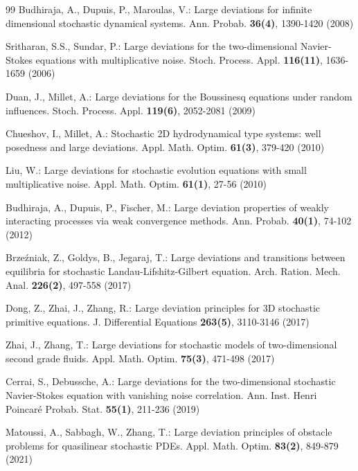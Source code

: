 \documentclass[11pt]{article}
\numberwithin{equation}{section}
\theoremstyle{plain}
\begin{document}
\begin{thebibliography}{99}
  Budhiraja, A.,  Dupuis, P.,  Maroulas, V.:
  Large deviations for infinite dimensional stochastic dynamical systems.
  Ann. Probab. {\bf 36(4)}, 1390-1420 (2008)




  Sritharan, S.S.,  Sundar, P.:
  Large deviations for the two-dimensional Navier-Stokes equations with multiplicative noise.
  Stoch. Process. Appl. {\bf 116(11)}, 1636-1659 (2006)

  Duan, J.,  Millet, A.:
  Large deviations for the Boussinesq equations under random influences.
  Stoch. Process. Appl. {\bf 119(6)}, 2052-2081 (2009)

  Chueshov, I.,  Millet, A.:
  Stochastic 2D hydrodynamical type systems: well posedness and large deviations.
  Appl. Math. Optim. {\bf 61(3)}, 379-420 (2010)

  Liu, W.:
  Large deviations for stochastic evolution equations with small multiplicative noise.
  Appl. Math. Optim. {\bf 61(1)}, 27-56 (2010)

  Budhiraja, A.,  Dupuis, P.,  Fischer, M.:
  Large deviation properties of weakly interacting processes via weak convergence  methods.
  Ann. Probab. {\bf 40(1)}, 74-102 (2012)

  Brze\'{z}niak, Z.,  Goldys,  B.,  Jegaraj,  T.:
  Large deviations and transitions between equilibria for stochastic Landau-Lifshitz-Gilbert equation.
  Arch. Ration. Mech. Anal. {\bf 226(2)}, 497-558 (2017)

  Dong, Z.,  Zhai, J.,  Zhang,  R.:
  Large deviation principles for 3D stochastic primitive equations.
  J. Differential Equations {\bf 263(5)}, 3110-3146 (2017)

  Zhai, J.,  Zhang, T.:
  Large deviations for stochastic models of two-dimensional second grade fluids.
  Appl. Math. Optim. {\bf 75(3)}, 471-498 (2017)

  Cerrai, S.,  Debussche, A.:
  Large deviations for the two-dimensional stochastic Navier-Stokes equation with vanishing noise correlation.
  Ann. Inst. Henri Poincar\'{e} Probab. Stat. {\bf 55(1)}, 211-236 (2019)


  Matoussi, A.,  Sabbagh, W.,  Zhang, T.:
  Large deviation principles of obstacle problems for quasilinear stochastic PDEs.
  Appl. Math. Optim. {\bf 83(2)}, 849-879 (2021)



\end{thebibliography}
\end{document}
